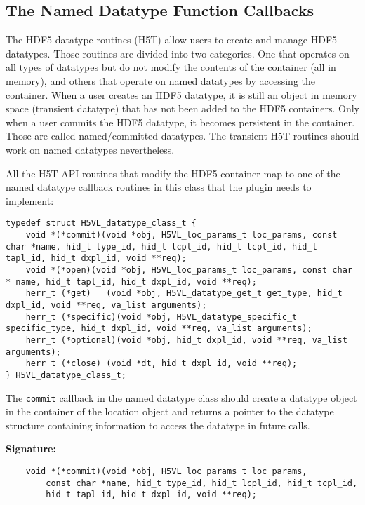\subsection{The Named Datatype Function Callbacks}
The HDF5 datatype routines (H5T) allow users to create and manage HDF5
datatypes. Those routines are divided into two categories. One that
operates on all types of datatypes but do not modify the contents of
the container (all in memory), and others that operate on named
datatypes by accessing the container. When a user creates an HDF5
datatype, it is still an object in memory space (transient datatype)
that has not been added to the HDF5 containers. Only when a user
commits the HDF5 datatype, it becomes persistent in the
container. Those are called named/committed datatypes. The transient
H5T routines should work on named datatypes nevertheless. 

All the H5T API routines that modify the HDF5 container map to one of
the named datatype callback routines in this class that the plugin needs to
implement:

\begin{lstlisting}
typedef struct H5VL_datatype_class_t {
    void *(*commit)(void *obj, H5VL_loc_params_t loc_params, const char *name, hid_t type_id, hid_t lcpl_id, hid_t tcpl_id, hid_t tapl_id, hid_t dxpl_id, void **req);
    void *(*open)(void *obj, H5VL_loc_params_t loc_params, const char * name, hid_t tapl_id, hid_t dxpl_id, void **req);
    herr_t (*get)   (void *obj, H5VL_datatype_get_t get_type, hid_t dxpl_id, void **req, va_list arguments);
    herr_t (*specific)(void *obj, H5VL_datatype_specific_t specific_type, hid_t dxpl_id, void **req, va_list arguments);
    herr_t (*optional)(void *obj, hid_t dxpl_id, void **req, va_list arguments);
    herr_t (*close) (void *dt, hid_t dxpl_id, void **req);
} H5VL_datatype_class_t;
\end{lstlisting}

The {\tt commit} callback in the named datatype class should create a datatype object in the container of the location object and
returns a pointer to the datatype structure containing information to access the datatype in future calls. 

\textbf{Signature:}
\begin{lstlisting}
    void *(*commit)(void *obj, H5VL_loc_params_t loc_params, 
        const char *name, hid_t type_id, hid_t lcpl_id, hid_t tcpl_id, 
        hid_t tapl_id, hid_t dxpl_id, void **req);
\end{lstlisting}

